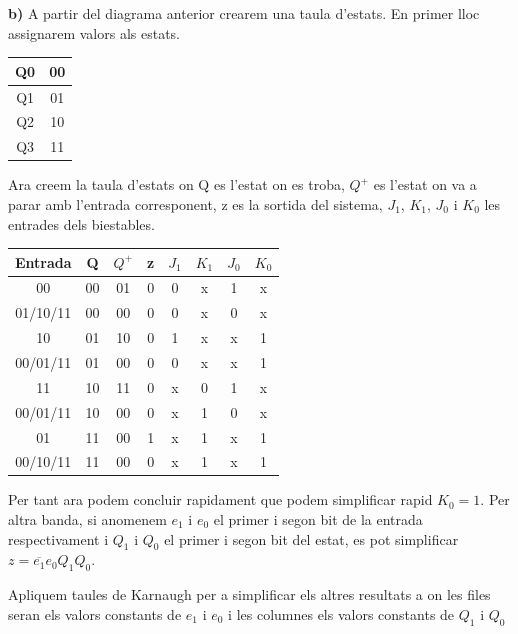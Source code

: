 \documentclass[12pt, a4papre]{article}
\begin{document}
	\textbf{b)}  A partir del diagrama anterior crearem una taula d'estats. En primer lloc assignarem valors als estats.
	
	\begin{table}[h!]
		\centering
		 \begin{tabular}{|c | c|} 
			 \hline
			  Q0 &  00\\ 
			  \hline
			  Q1 &  01\\ 
			 \hline
			 Q2 & 10\\ [0.5ex] 
			 \hline
			 Q3 & 11\\ 
			 \hline
		 \end{tabular}
	\end{table}
	
	Ara creem la taula d'estats on Q es l'estat on es troba, $Q^+$ es l'estat on va a parar amb l'entrada corresponent, z es la sortida del sistema, $J_1$, $K_1$, $J_0$ i $K_0$ les entrades dels biestables.
	
	\begin{table}[h!]
		\centering
		 \begin{tabular}{| c | c | c | c | c | c | c | c |} 
		 	 \hline
			 Entrada & Q & $Q^+$ & z & $J_1$ & $K_1$ & $J_0$ & $K_0$\\
			 \hline\hline
			  00 &  00 & 01 & 0 & 0 & x & 1 & x\\ 
			  \hline
			  01/10/11 &  00 & 00 & 0 & 0 & x & 0 & x\\ 
			 \hline
			 10 &  01 & 10 & 0 & 1 & x & x & 1\\ 
			  \hline
			  00/01/11 &  01 & 00 & 0 & 0 & x & x & 1\\ 
			  \hline
			 11 &  10 & 11 & 0 & x & 0 & 1 & x\\ 
			  \hline
			  00/01/11 &  10 & 00 & 0 & x & 1 & 0 & x\\ 
			  \hline
			 01 &  11 & 00 & 1 & x & 1 & x & 1\\ 
			  \hline
			  00/10/11 &  11 & 00 & 0 & x & 1 & x & 1\\ 
			 \hline
		 \end{tabular}
	\end{table}
	
	Per tant ara podem concluir rapidament que podem simplificar rapid $K_0 = 1$. Per altra banda, si anomenem $e_1$ i $e_0$ el primer i segon bit de la entrada respectivament i $Q_1$ i $Q_0$ el primer i segon bit del estat, es pot simplificar $z = \overline{e_1}e_0Q_1Q_0$.
	
	Apliquem taules de Karnaugh per a simplificar els altres resultats a on les files seran els valors constants de $e_1$ i $e_0$ i les columnes els valors constants de $Q_1$ i $Q_0$
	
\end{document}
